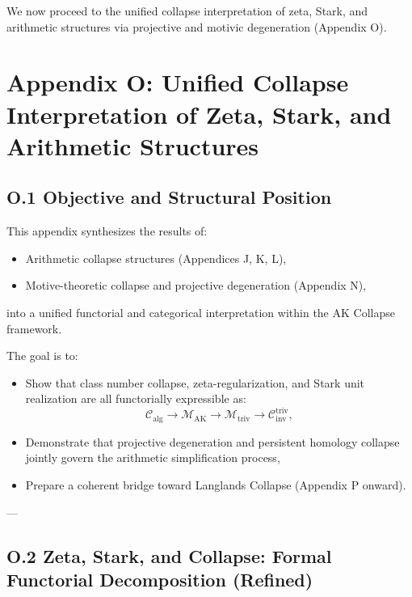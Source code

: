 \documentclass[11pt]{article}
\begin{document}
We now proceed to the unified collapse interpretation of zeta, Stark, and arithmetic structures via projective and motivic degeneration (Appendix O).




\section*{Appendix O: Unified Collapse Interpretation of Zeta, Stark, and Arithmetic Structures}

\subsection*{O.1 Objective and Structural Position}

This appendix synthesizes the results of:
\begin{itemize}
  \item Arithmetic collapse structures (Appendices J, K, L),
  \item Motive-theoretic collapse and projective degeneration (Appendix N),
\end{itemize}
into a unified functorial and categorical interpretation within the AK Collapse framework.

The goal is to:
\begin{itemize}
  \item Show that class number collapse, zeta-regularization, and Stark unit realization are all functorially expressible as:
  \[
  \mathcal{C}_{\mathrm{alg}} \longrightarrow \mathcal{M}_{\mathrm{AK}} \longrightarrow \mathcal{M}_{\mathrm{triv}} \longrightarrow \mathcal{C}_{\mathrm{inv}}^{\mathrm{triv}},
  \]
  \item Demonstrate that projective degeneration and persistent homology collapse jointly govern the arithmetic simplification process,
  \item Prepare a coherent bridge toward Langlands Collapse (Appendix P onward).
\end{itemize}

---

\subsection*{O.2 Zeta, Stark, and Collapse: Formal Functorial Decomposition (Refined)}
\end{document}
